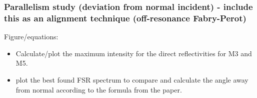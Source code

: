 \subsubsection{Parallelism study (deviation from normal incident) - include this as an alignment technique (off-resonance Fabry-Perot)}\label{sec:parallelism}

Figure/equations:
\begin{itemize}
    \item Calculate/plot the maximum intensity for the direct reflectivities for M3 and M5. 
    \item plot the best found FSR spectrum to compare and calculate the angle away from normal according to the formula from the paper. 
\end{itemize}

